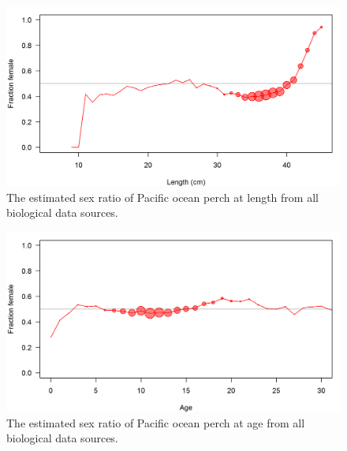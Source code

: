 \documentclass[12pt,]{article}
\begin{document}
\FloatBarrier

\FloatBarrier

\begin{figure}
\centering
\includegraphics{Figures/allSexRatios.png}
\caption{The estimated sex ratio of Pacific ocean perch at length from
all biological data sources. \label{fig:sexratio}}
\end{figure}

\begin{figure}
\centering
\includegraphics{Figures/allSexRatiosAge.png}
\caption{The estimated sex ratio of Pacific ocean perch at age from all
biological data sources. \label{fig:sexratio_Age}}
\end{figure}
\end{document}

